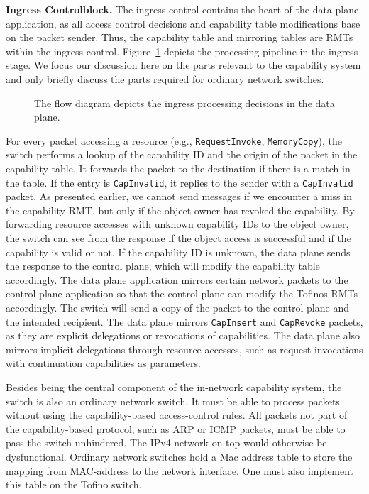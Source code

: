 \textbf{Ingress Controlblock.}
The ingress control contains the heart of the data-plane application, as all access control decisions and capability table modifications base on the packet sender. Thus, the capability table and mirroring tables are \acp{RMT} within the ingress control. Figure~\ref{fig:ingress-decision} depicts the processing pipeline in the ingress stage. We focus our discussion here on the parts relevant to the capability system and only briefly discuss the parts required for ordinary network switches.

\begin{figure}[ht]
  \centering
  \resizebox{\textwidth}{!}{
    
  }
  \caption{\label{fig:ingress-decision} The flow diagram depicts the ingress processing decisions in the data plane.}
\end{figure}
For every packet accessing a resource (e.g., \texttt{RequestInvoke}, \texttt{MemoryCopy}), the switch performs a lookup of the capability ID and the origin of the packet in the capability table. It forwards the packet to the destination if there is a match in the table. If the entry is \texttt{CapInvalid}, it replies to the sender with a \texttt{CapInvalid} packet.
As presented earlier, we cannot send  messages if we encounter a miss in the capability \ac{RMT}, but only if the object owner has revoked the capability.
By forwarding resource accesses with unknown capability IDs to the object owner, the switch can see from the response if the object access is successful and if the capability is valid or not.
If the capability ID is unknown, the data plane sends the response to the control plane, which will modify the capability table accordingly.
The data plane application mirrors certain network packets to the control plane application so that the control plane can modify the Tofinos \acp{RMT} accordingly. The switch will send a copy of the packet to the control plane and the intended recipient. The data plane mirrors \texttt{CapInsert} and \texttt{CapRevoke} packets, as they are explicit delegations or revocations of capabilities. The data plane also mirrors implicit delegations through resource accesses, such as request invocations with continuation capabilities as parameters.

Besides being the central component of the in-network capability system, the \tofino{} switch is also an ordinary network switch. It must be able to process packets without using the capability-based access-control rules. All packets not part of the capability-based protocol, such as \ac{ARP} or \ac{ICMP} packets, must be able to pass the switch unhindered. The \ac{IPv4} network on top would otherwise be dysfunctional.
Ordinary network switches hold a Mac address table to store the mapping from \ac{MAC}-address to the network interface. One must also implement this table on the Tofino switch.

